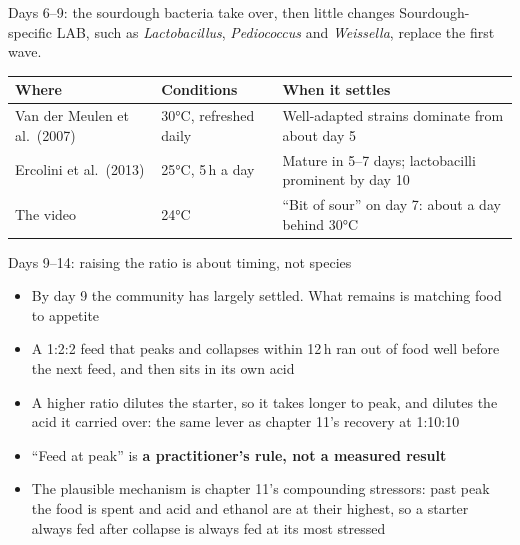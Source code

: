 \documentclass[aspectratio=169,11pt]{beamer}
\begin{document}
\begin{frame}{Days 6--9: the sourdough bacteria take over, then little changes}
  \small
  Sourdough-specific LAB, such as \textit{Lactobacillus}, \textit{Pediococcus} and \textit{Weissella}, replace the first wave.
  \medskip

  \begin{tabularx}{\linewidth}{@{}l l >{\raggedright\arraybackslash}X@{}}
    \toprule
    \textbf{Where} & \textbf{Conditions} & \textbf{When it settles} \\
    \midrule
    Van der Meulen et al.\ (2007) & 30°C, refreshed daily & Well-adapted strains dominate from about day 5 \\
    Ercolini et al.\ (2013) & 25°C, 5\,h a day & Mature in 5--7 days; lactobacilli prominent by day 10 \\
    The video & 24°C & ``Bit of sour'' on day 7: about a day behind 30°C \\
    \bottomrule
  \end{tabularx}
\end{frame}

\begin{frame}{Days 9--14: raising the ratio is about timing, not species}
  \small
  \begin{itemize}
    \item By day 9 the community has largely settled. What remains is matching food to appetite
    \item A 1:2:2 feed that peaks and collapses within 12\,h ran out of food well before the next feed, and then sits in its own acid
    \item A higher ratio dilutes the starter, so it takes longer to peak, and dilutes the acid it carried over: the same lever as chapter 11's recovery at 1:10:10
    \item ``Feed at peak'' is \textbf{a practitioner's rule, not a measured result}
    \item The plausible mechanism is chapter 11's compounding stressors: past peak the food is spent and acid and ethanol are at their highest, so a starter always fed after collapse is always fed at its most stressed
  \end{itemize}
\end{frame}
\end{document}
